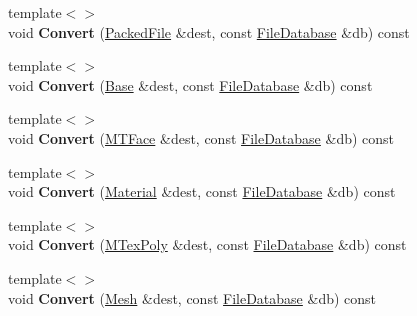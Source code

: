 \begin{DoxyCompactItemize}
\item 
\hypertarget{class_assimp_1_1_blender_1_1_structure_ab09c94f741f25fa8237c88553618232d}{{\footnotesize template$<$$>$ }\\void {\bfseries Convert} (\hyperlink{struct_assimp_1_1_blender_1_1_packed_file}{Packed\+File} \&dest, const \hyperlink{class_assimp_1_1_blender_1_1_file_database}{File\+Database} \&db) const }\label{class_assimp_1_1_blender_1_1_structure_ab09c94f741f25fa8237c88553618232d}

\item 
\hypertarget{class_assimp_1_1_blender_1_1_structure_afd89fe0f108140049636d7dfa71faac8}{{\footnotesize template$<$$>$ }\\void {\bfseries Convert} (\hyperlink{struct_assimp_1_1_blender_1_1_base}{Base} \&dest, const \hyperlink{class_assimp_1_1_blender_1_1_file_database}{File\+Database} \&db) const }\label{class_assimp_1_1_blender_1_1_structure_afd89fe0f108140049636d7dfa71faac8}

\item 
\hypertarget{class_assimp_1_1_blender_1_1_structure_acf32822fa1aa419c0496838afb9f54fb}{{\footnotesize template$<$$>$ }\\void {\bfseries Convert} (\hyperlink{struct_assimp_1_1_blender_1_1_m_t_face}{M\+T\+Face} \&dest, const \hyperlink{class_assimp_1_1_blender_1_1_file_database}{File\+Database} \&db) const }\label{class_assimp_1_1_blender_1_1_structure_acf32822fa1aa419c0496838afb9f54fb}

\item 
\hypertarget{class_assimp_1_1_blender_1_1_structure_affc3a881034e9cd9f8b4112e871131da}{{\footnotesize template$<$$>$ }\\void {\bfseries Convert} (\hyperlink{struct_assimp_1_1_blender_1_1_material}{Material} \&dest, const \hyperlink{class_assimp_1_1_blender_1_1_file_database}{File\+Database} \&db) const }\label{class_assimp_1_1_blender_1_1_structure_affc3a881034e9cd9f8b4112e871131da}

\item 
\hypertarget{class_assimp_1_1_blender_1_1_structure_a1f782b46753ee065fea51fd78f843f7d}{{\footnotesize template$<$$>$ }\\void {\bfseries Convert} (\hyperlink{struct_assimp_1_1_blender_1_1_m_tex_poly}{M\+Tex\+Poly} \&dest, const \hyperlink{class_assimp_1_1_blender_1_1_file_database}{File\+Database} \&db) const }\label{class_assimp_1_1_blender_1_1_structure_a1f782b46753ee065fea51fd78f843f7d}

\item 
\hypertarget{class_assimp_1_1_blender_1_1_structure_a535309160ec0cad3f79aabf978cdfeed}{{\footnotesize template$<$$>$ }\\void {\bfseries Convert} (\hyperlink{struct_assimp_1_1_blender_1_1_mesh}{Mesh} \&dest, const \hyperlink{class_assimp_1_1_blender_1_1_file_database}{File\+Database} \&db) const }\label{class_assimp_1_1_blender_1_1_structure_a535309160ec0cad3f79aabf978cdfeed}


\end{DoxyCompactItemize}

